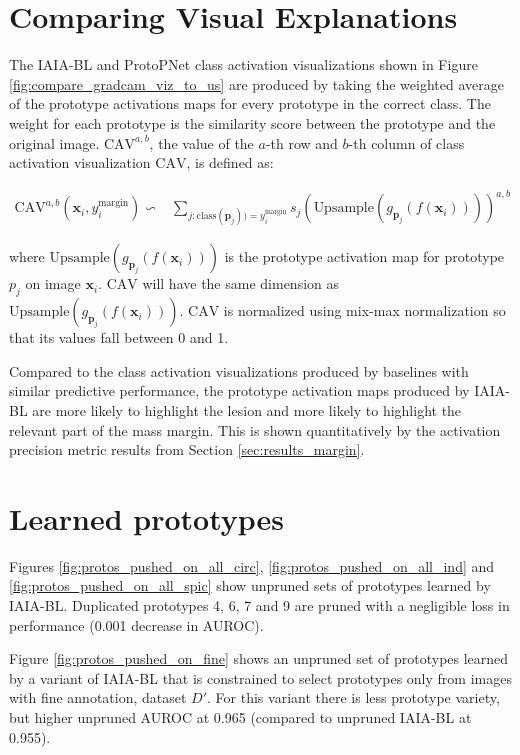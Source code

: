 \documentclass[11pt]{article}
\begin{document}
\FloatBarrier
\section{Comparing Visual Explanations} \label{app:compare_viz_expls}
\FloatBarrier

The IAIA-BL and ProtoPNet class activation visualizations shown in Figure \ref{fig:compare_gradcam_viz_to_us} are produced by taking the weighted average of the prototype activations maps for every prototype in the correct class. The weight for each prototype is the similarity score between the prototype and the original image. $\textrm{CAV}^{a,b}$, the value of the $a$-th row and $b$-th column of class activation visualization $\textrm{CAV}$, is defined as:

\begin{align}
    \textrm{CAV}^{a,b}(\mathbf{x}_i, y_i^{\text{margin}}) \backsim & \sum_{j: \text{class}(\mathbf{p}_j) ) = y^{\text{margin}}_i} s_j \left(\textrm{Upsample}\left(g_{\mathbf{p}_j}(f(\mathbf{x}_i))\right)\right)^{a,b}
\end{align}

where $\textrm{Upsample}\left(g_{\mathbf{p}_j}(f(\mathbf{x}_i))\right)$ is the prototype activation map for prototype $p_j$ on image $\mathbf{x}_i$. $\textrm{CAV}$ will have the same dimension as $\textrm{Upsample}\left(g_{\mathbf{p}_j}(f(\mathbf{x}_i))\right)$. $\textrm{CAV}$ is normalized using mix-max normalization so that its values fall between 0 and 1.

Compared to the class activation visualizations produced by baselines with similar predictive performance, the prototype activation maps produced by IAIA-BL are more likely to highlight the lesion and more likely to highlight the relevant part of the mass margin. This is shown quantitatively  by the activation precision metric results from Section \ref{sec:results_margin}.

\FloatBarrier
\section{Learned prototypes} \label{app:prototype_sets}
\FloatBarrier
Figures \ref{fig:protos_pushed_on_all_circ}, \ref{fig:protos_pushed_on_all_ind} and \ref{fig:protos_pushed_on_all_spic} show unpruned sets of prototypes learned by IAIA-BL. Duplicated prototypes 4, 6, 7 and 9 are pruned with a negligible loss in performance (0.001 decrease in AUROC).

Figure \ref{fig:protos_pushed_on_fine} shows an unpruned set of prototypes learned by a variant of IAIA-BL that is constrained to select prototypes only from images with fine annotation, dataset $D'$. For this variant there is less prototype variety, but higher unpruned AUROC at 0.965 (compared to unpruned IAIA-BL at 0.955).
\end{document}
